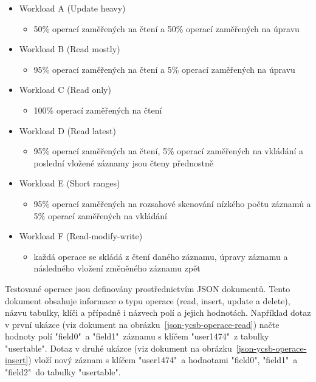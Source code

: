 \documentclass[czech,master,dept460,male,csharp,cpdeclaration]{diploma}
\begin{document}
	\begin{itemize} \label{lab-workloads}
		\item Workload A (Update heavy)
		\begin{itemize}
			\item 50\% operací zaměřených na čtení a 50\% operací zaměřených na úpravu
		\end{itemize}
		\item Workload B (Read mostly)
		\begin{itemize}
			\item 95\% operací zaměřených na čtení a 5\% operací zaměřených na úpravu
		\end{itemize}
		\item Workload C (Read only)
		\begin{itemize}
			\item 100\% operací zaměřených na čtení
		\end{itemize}
		\item Workload D (Read latest)
		\begin{itemize}
			\item 95\% operací zaměřených na čtení, 5\% operací zaměřených na vkládání a poslední vložené záznamy jsou čteny přednostně
		\end{itemize}
		\item Workload E (Short ranges)
		\begin{itemize}
			\item 95\% operací zaměřených na rozsahové skenování nízkého počtu záznamů a 5\% operací zaměřených na vkládání
		\end{itemize}
		\item Workload F (Read-modify-write)
		\begin{itemize}
			\item každá operace se skládá z čtení daného záznamu, úpravy záznamu a následného vložení změněného záznamu zpět
		\end{itemize}
	\end{itemize}
	
	Testované operace jsou definovány prostřednictvím JSON dokumentů. Tento dokument obsahuje informace o typu operace (read, insert, update a delete), názvu tabulky, klíči a případně i názvech polí a jejich hodnotách. Například dotaz v první ukázce (viz dokument na obrázku~\ref{json-ycsb-operace-read}) načte hodnoty polí "field0"~a "field1"~záznamu s klíčem "user1474"~z tabulky "usertable". Dotaz v druhé ukázce (viz dokument na obrázku~\ref{json-ycsb-operace-insert}) vloží nový záznam s klíčem "user1474"~a hodnotami "field0", "field1"~a "field2"~do tabulky "usertable".
	
\end{document}
